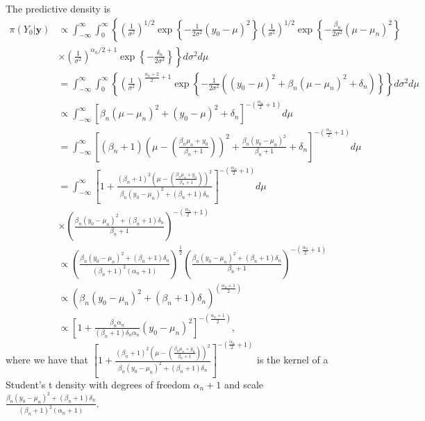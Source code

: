 \begin{enumerate}
The predictive density is
{\footnotesize{
\begin{align}
	\pi(Y_0|\bm{y})&\propto\int_{-\infty}^{\infty}\int_0^{\infty}\left\{ \left(\frac{1}{\sigma^2}\right)^{1/2}\exp\left\{-\frac{1}{2\sigma^2}(y_0-\mu)^2\right\}\left(\frac{1}{\sigma^2}\right)^{1/2}\exp\left\{-\frac{\beta_n}{2\sigma^2}(\mu-\mu_n)^2\right\}\right.\nonumber\\
	&\times \left.\left(\frac{1}{\sigma^2}\right)^{\alpha_n/2+1}\exp\left\{-\frac{\delta_n}{2\sigma^2}\right\}\right\}d\sigma^2d\mu\nonumber\\
	&=\int_{-\infty}^{\infty}\int_0^{\infty}\left\{ \left(\frac{1}{\sigma^2}\right)^{\frac{\alpha_n+2}{2}+1}\exp\left\{-\frac{1}{2\sigma^2}((y_0-\mu)^2+\beta_n(\mu-\mu_n)^2+\delta_n)\right\}\right\}d\sigma^2d\mu\nonumber\\
	&\propto\int_{-\infty}^{\infty}\left[\beta_n(\mu-\mu_n)^2+(y_0-\mu)^2+\delta_n\right]^{-\left(\frac{\alpha_n}{2}+1\right)}d\mu\nonumber\\
	&=\int_{-\infty}^{\infty}\left[(\beta_n+1)\left(\mu-\left(\frac{\beta_n\mu_n+y_0}{\beta_n+1}\right)\right)^2+\frac{\beta_n(y_0-\mu_n)^2}{\beta_n+1}+\delta_n\right]^{-\left(\frac{\alpha_n}{2}+1\right)}d\mu\nonumber\\
	&=\int_{-\infty}^{\infty}\left[1+\frac{(\beta_n+1)^2\left(\mu-\left(\frac{\beta_n\mu_n+y_0}{\beta_n+1}\right)\right)^2}{\beta_n(y_0-\mu_n)^2+(\beta_n+1)\delta_n}\right]^{-\left(\frac{\alpha_n}{2}+1\right)}d\mu\nonumber\\
	&\times\left(\frac{\beta_n(y_0-\mu_n)^2+(\beta_n+1)\delta_n}{\beta_n+1}\right)^{-\left(\frac{\alpha_n}{2}+1\right)}\nonumber\\
	&\propto\left(\frac{\beta_n(y_0-\mu_n)^2+(\beta_n+1)\delta_n}{(\beta_n+1)^2(\alpha_n+1)}\right)^{\frac{1}{2}}\left(\frac{\beta_n(y_0-\mu_n)^2+(\beta_n+1)\delta_n}{\beta_n+1}\right)^{-\left(\frac{\alpha_n}{2}+1\right)}\nonumber\\
	&\propto (\beta_n(y_0-\mu_n)^2+(\beta_n+1)\delta_n)^{\left(\frac{\alpha_n+1}{2}\right)}\nonumber\\
	&\propto\left[1+\frac{\beta_n\alpha_n}{(\beta_n+1)\delta_n\alpha_n}(y_0-\mu_n)^2\right]^{-\left(\frac{\alpha_n+1}{2}\right)},\nonumber
\end{align}
}}
where we have that $\left[1+\frac{(\beta_n+1)^2\left(\mu-\left(\frac{\beta_n\mu_n+y_0}{\beta_n+1}\right)\right)^2}{\beta_n(y_0-\mu_n)^2+(\beta_n+1)\delta_n}\right]^{-\left(\frac{\alpha_n}{2}+1\right)}$ is the kernel of a Student's t density with degrees of freedom $\alpha_n+1$ and scale $\frac{\beta_n(y_0-\mu_n)^2+(\beta_n+1)\delta_n}{(\beta_n+1)^2(\alpha_n+1)}$. 


\end{enumerate}
